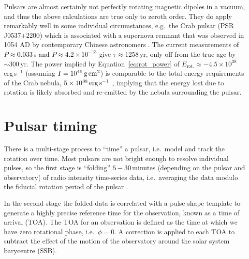 Pulsars are almost certainly not perfectly rotating magnetic dipoles in a vacuum, and thus the above calculations are true only to zeroth order. They do apply remarkably well in some individual circumstances, e.g.~the Crab pulsar (PSR J0537+2200) which is associated with a supernova remnant that was observed in 1054 AD by contemporary Chinese astronomers \citep{Mayall1939}. The current measurements of $P \approx 0.033\,$s and $\dot{P}\approx 4.2\times10^{-13}$ \citep{Lyne2015} give $\tau \approx 1258\,$yr, only off from the true age by $\sim 300\,$yr. The power implied by Equation~\eqref{eq:rot_power} of $\dot{E}_\textrm{rot.} \approx -4.5\times10^{38}\,$erg\,s$^{-1}$ (assuming $I = 10^{45}\,\textrm{g\,cm}^2$) is comparable to the total energy requirements of the Crab nebula, $5\times10^{38}\,\textrm{erg\,s}^{-1}$ \citep{Hester2008}, implying that the energy lost due to rotation is likely absorbed and re-emitted by the nebula surrounding the pulsar.

\section{Pulsar timing} \label{sec:intro_timing}
There is a multi-stage process to ``time'' a pulsar, i.e.~model and track the rotation over time. Most pulsars are not bright enough to resolve individual pulses, so the first stage is ``folding'' $5-30\,$minutes (depending on the pulsar and observatory) of radio intensity time-series data, i.e.~averaging the data modulo the fiducial rotation period of the pulsar \citep{Lorimer2004}. 

In the second stage the folded data is correlated with a pulse shape template to generate a highly precise reference time for the observation, known as a time of arrival (TOA). The TOA for an observation is defined as the time at which we have zero rotational phase, i.e.~$\phi = 0$. A correction is applied to each TOA to subtract the effect of the motion of the observatory around the solar system barycentre (SSB).

